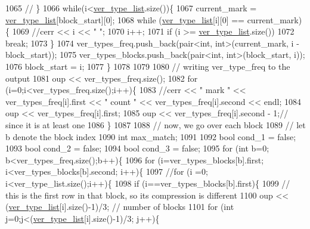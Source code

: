 \begin{DoxyCode}
1065   \textcolor{comment}{// \}}
1066   \textcolor{keywordflow}{while}(i<\hyperlink{classmarked__graph__compressed_af2e3e55223d436628a02758dfae88493}{ver\_type\_list}.size())\{
1067     current\_mark = \hyperlink{classmarked__graph__compressed_af2e3e55223d436628a02758dfae88493}{ver\_type\_list}[block\_start][0];
1068     \textcolor{keywordflow}{while} (\hyperlink{classmarked__graph__compressed_af2e3e55223d436628a02758dfae88493}{ver\_type\_list}[i][0] == current\_mark)\{
1069       \textcolor{comment}{//cerr << i << " ";}
1070       i++;
1071       \textcolor{keywordflow}{if} (i >= \hyperlink{classmarked__graph__compressed_af2e3e55223d436628a02758dfae88493}{ver\_type\_list}.size())
1072         \textcolor{keywordflow}{break};
1073     \}
1074     ver\_types\_freq.push\_back(pair<int, int>(current\_mark, i - block\_start));
1075     ver\_types\_blocks.push\_back(pair<int, int>(block\_start, i));
1076     block\_start = i;
1077   \}
1078 
1079 
1080   \textcolor{comment}{// writing ver\_type\_freq to the output}
1081   oup << ver\_types\_freq.size();
1082   \textcolor{keywordflow}{for} (i=0;i<ver\_types\_freq.size();i++)\{
1083     \textcolor{comment}{//cerr << " mark " << ver\_types\_freq[i].first << " count " << ver\_types\_freq[i].second << endl;}
1084     oup << ver\_types\_freq[i].first;
1085     oup << ver\_types\_freq[i].second - 1;\textcolor{comment}{// since it is at least one}
1086   \}
1087 
1088   \textcolor{comment}{// now, we go over each block}
1089   \textcolor{comment}{// let b denote the block index}
1090   \textcolor{keywordtype}{int} max\_match;
1091 
1092   \textcolor{keywordtype}{bool} cond\_1 = \textcolor{keyword}{false};
1093   \textcolor{keywordtype}{bool} cond\_2 = \textcolor{keyword}{false};
1094   \textcolor{keywordtype}{bool} cond\_3 = \textcolor{keyword}{false};
1095   \textcolor{keywordflow}{for} (\textcolor{keywordtype}{int} b=0; b<ver\_types\_freq.size();b++)\{
1096     \textcolor{keywordflow}{for} (i=ver\_types\_blocks[b].first; i<ver\_types\_blocks[b].second; i++)\{
1097       \textcolor{comment}{//for (i =0; i<ver\_type\_list.size();i++)\{}
1098       \textcolor{keywordflow}{if} (i==ver\_types\_blocks[b].first)\{
1099         \textcolor{comment}{// this is the first row in that block, so its compression is different}
1100         oup << (\hyperlink{classmarked__graph__compressed_af2e3e55223d436628a02758dfae88493}{ver\_type\_list}[i].size()-1)/3; \textcolor{comment}{// number of blocks}
1101         \textcolor{keywordflow}{for} (\textcolor{keywordtype}{int} j=0;j<(\hyperlink{classmarked__graph__compressed_af2e3e55223d436628a02758dfae88493}{ver\_type\_list}[i].size()-1)/3; j++)\{

\end{DoxyCode}
